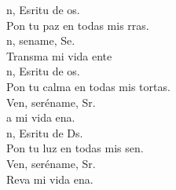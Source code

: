 \begin{cancion}%
	n, Esritu de os. \\
	Pon tu paz en todas mis rras.\\
	n, sename, Se. \\
	Transma mi vida ente\\
	n, Esritu de os. \\
	Pon tu calma en todas mis tortas.\\
	Ven, seréname, Sr.\\
	a mi vida ena.\\
	n, Esritu de Ds. \\
	Pon tu luz en todas mis sen.\\
	Ven, seréname, Sr.\\
	Reva mi vida ena.\\
\end{cancion}%
